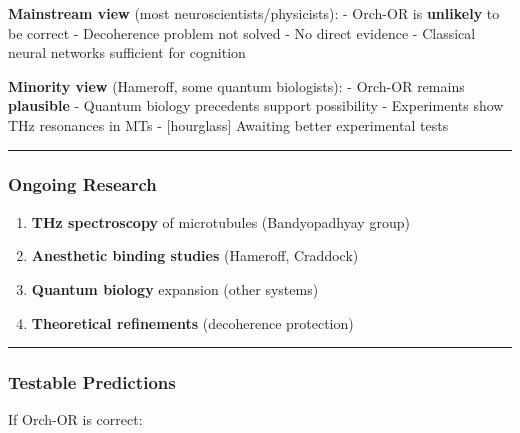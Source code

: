 \textbf{Mainstream view} (most neuroscientists/physicists): - Orch-OR is
\textbf{unlikely} to be correct - Decoherence problem not solved - No
direct evidence - Classical neural networks sufficient for cognition

\textbf{Minority view} (Hameroff, some quantum biologists): - Orch-OR
remains \textbf{plausible} - Quantum biology precedents support
possibility - Experiments show THz resonances in MTs - {[}hourglass{]}
Awaiting better experimental tests

\begin{center}\rule{0.5\linewidth}{0.5pt}\end{center}

\subsubsection{Ongoing Research}\label{ongoing-research}

\begin{enumerate}
\def\labelenumi{\arabic{enumi}.}
\tightlist
\item
  \textbf{THz spectroscopy} of microtubules (Bandyopadhyay group)
\item
  \textbf{Anesthetic binding studies} (Hameroff, Craddock)
\item
  \textbf{Quantum biology} expansion (other systems)
\item
  \textbf{Theoretical refinements} (decoherence protection)
\end{enumerate}

\begin{center}\rule{0.5\linewidth}{0.5pt}\end{center}

\subsubsection{Testable Predictions}\label{testable-predictions}

If Orch-OR is correct:

